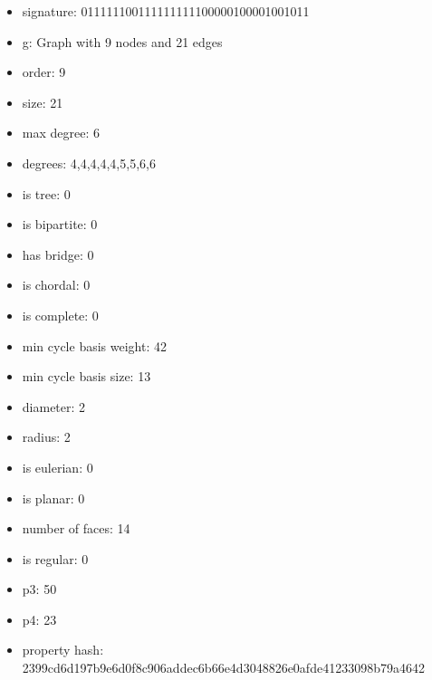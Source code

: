 \newpage
\begin{figure}
\end{figure}
\begin{itemize}
\item signature: 011111100111111111100000100001001011
\item g: Graph with 9 nodes and 21 edges
\item order: 9
\item size: 21
\item max degree: 6
\item degrees: 4,4,4,4,4,5,5,6,6
\item is tree: 0
\item is bipartite: 0
\item has bridge: 0
\item is chordal: 0
\item is complete: 0
\item min cycle basis weight: 42
\item min cycle basis size: 13
\item diameter: 2
\item radius: 2
\item is eulerian: 0
\item is planar: 0
\item number of faces: 14
\item is regular: 0
\item p3: 50
\item p4: 23
\item property hash: 2399cd6d197b9e6d0f8c906addec6b66e4d3048826e0afde41233098b79a4642
\end{itemize}
